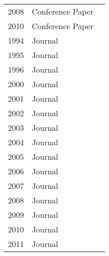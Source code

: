 \begin{table}[]
\begin{tabular}{lll}
2008          & Conference Paper & \cite{Jiang2008b}                                                                   \\
2010          & Conference Paper & \cite{Yu2010a}                                                                      \\
1994          & Journal          & \cite{Avritzer1994}                                                                 \\
1995          & Journal          & \cite{Avritzer1995}\cite{Trent1995}                                                 \\
1996          & Journal          & \cite{Yang1996}                                                                     \\
2000          & Journal          & \cite{Weyuker2000}                                                                  \\
2001          & Journal          & \cite{El-far2001}                                                                   \\
2002          & Journal          & \cite{Menasce2002a}                                                                 \\
2003          & Journal          & \cite{Brown2003}                                                                    \\
2004          & Journal          & \cite{Dumitrescu2004}\cite{Sandler2004}                                             \\
2005          & Journal          & \cite{Briand2005}                                                                   \\
2006          & Journal          & \cite{Garousi2006}                                                                  \\
2007          & Journal          & \cite{Cai2007}\cite{Nevedrov2007}\cite{Bertolino2008}                               \\
2008          & Journal          & \cite{Bayan2008}                                                                    \\
2009          & Journal          & \cite{Acharya2009}                                                                  \\
2010          & Journal          & \cite{Wang2010}\cite{Malik2010b}                                                    \\
2011          & Journal          & \cite{Babbar2011}\cite{Barna2011}\cite{Nguyen2011}\cite{Shoaib2011}\cite{Zhang2011} \\

\end{tabular}
\end{table}
